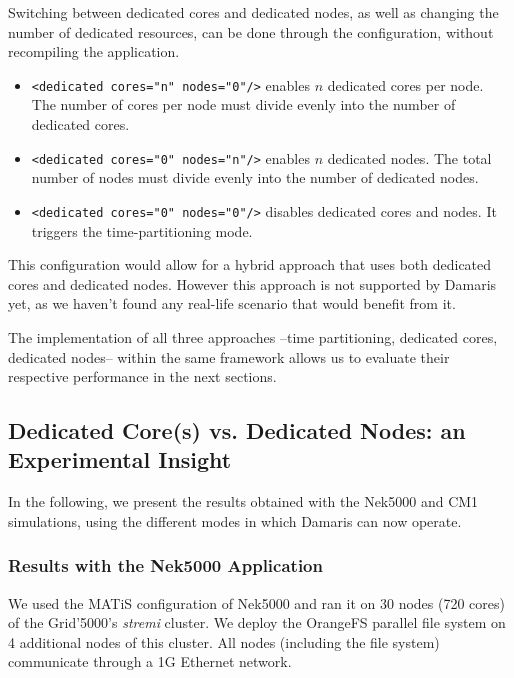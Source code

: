 Switching between dedicated cores and dedicated nodes, as well as changing the number of
dedicated resources, can be done through the configuration, without recompiling the
application.

\begin{itemize}
\item \verb+<dedicated cores="n" nodes="0"/>+ enables $n$ dedicated cores per node.
The number of cores per node must divide evenly into the number of dedicated cores.
\item \verb+<dedicated cores="0" nodes="n"/>+ enables $n$ dedicated nodes. 
The total number of nodes must divide evenly into the number of dedicated nodes.
\item \verb+<dedicated cores="0" nodes="0"/>+ disables dedicated cores and nodes. It triggers the time-partitioning mode.
\end{itemize}

This configuration would allow for a hybrid approach that uses
both dedicated cores and dedicated nodes. However this approach is not supported by
Damaris yet, as we haven't found any real-life scenario that would benefit from it.

The implementation of all three approaches --time partitioning, dedicated cores, dedicated nodes-- 
within the same framework allows us to evaluate their respective performance in the next sections.


\subsection{Dedicated Core(s) vs. Dedicated Nodes: an Experimental Insight}

In the following, we present the results obtained with the Nek5000 and CM1 simulations,
using the different modes in which Damaris can now operate.

\subsubsection{Results with the Nek5000 Application}

We used the MATiS configuration of Nek5000 and ran it
on 30 nodes (720 cores) of the Grid'5000's \emph{stremi} cluster. We deploy
the OrangeFS parallel file system on 4 additional nodes of this cluster.
All nodes (including the file system) communicate through a 1G Ethernet network.

